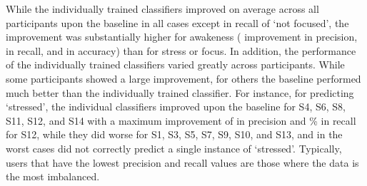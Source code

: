 While the individually trained classifiers
improved on average across all participants upon the baseline in all
cases except in recall of `not focused', the improvement was
substantially higher for awakeness ( improvement in precision,
 in recall, and  in accuracy) than for stress or focus. In addition,
the performance of the individually trained classifiers varied greatly
across participants. While some participants showed a large
improvement, for others the baseline performed much better than the
individually trained classifier. For instance, for predicting
`stressed', the individual classifiers improved upon the baseline for
S4, S6, S8, S11, S12, and S14 with a maximum improvement of  in
precision and \% in recall for S12, while they did worse for S1,
S3, S5, S7, S9, S10, and S13, and in the worst cases did not correctly
predict a single instance of `stressed'. Typically, users that have the
lowest precision and recall values are those where the data is the
most imbalanced.\\[-0.1cm]
%


